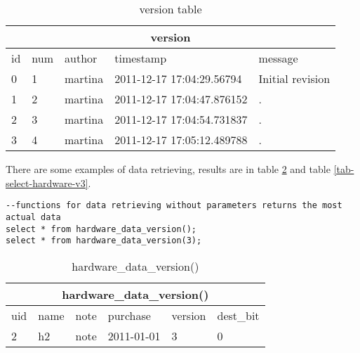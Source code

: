 \documentclass[deska]{subfiles}
\begin{document}
\begin{center}

\begin{table}
    \caption{version table}
    \label{tab-example-version}
\begin{tabular}{ | l | l | l | l | l |}
    \hline
    \multicolumn{5}{|c|}{version}\\
    \hline
    id & num & author & timestamp & message\\
    \hline
    0 & 1 & martina & 2011-12-17 17:04:29.56794 & Initial revision\\
    1 & 2 & martina & 2011-12-17 17:04:47.876152 & .\\
    2 & 3 & martina & 2011-12-17 17:04:54.731837 & .\\
    3 & 4 & martina & 2011-12-17 17:05:12.489788 & .\\
    \hline
\end{tabular}
\end{table}

\end{center}


There are some examples of data retrieving, results are in table \ref{tab-select-hardware} and table \ref{tab-select-hardware-v3}.\\

\begin{verbatim}
--functions for data retrieving without parameters returns the most actual data
select * from hardware_data_version();
select * from hardware_data_version(3);
\end{verbatim}

\begin{center}

\begin{table}
    \caption{hardware\_data\_version()}
    \label{tab-select-hardware}
\begin{tabular}{ | l | l | l | l | l | l |}
    \hline
    \multicolumn{6}{|c|}{hardware\_data\_version()}\\
    \hline
    uid & name & note & purchase & version & dest\_bit\\
    \hline
    2 & h2 & note & 2011-01-01 & 3 & 0\\
    \hline
\end{tabular}
\end{table}

\end{center}
\end{document}
